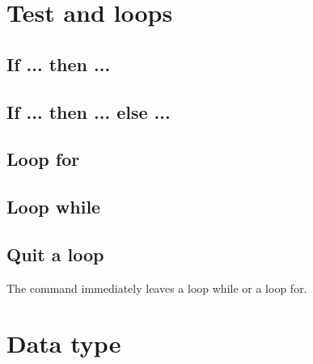 \documentclass[11pt,class=report,crop=false]{standalone}
\begin{document}



\section{Test and loops}

\subsection{If ... then ...}

\subsection{If ... then ... else ... }


\subsection{Loop for}


\subsection{Loop while}


\subsection{Quit a loop}

The command  immediately leaves a loop \og{}while\fg{}
or a loop \og{}for\fg{}.



\section{Data type}
\end{document}
